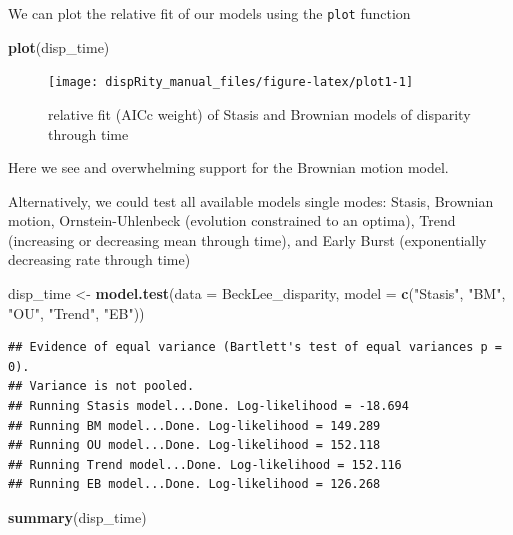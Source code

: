 \documentclass[
]{book}
\newenvironment{Shaded}{\begin{snugshade}}{\end{snugshade}}
\newcommand{\DataTypeTok}[1]{\textcolor[rgb]{0.13,0.29,0.53}{#1}}
\newcommand{\KeywordTok}[1]{\textcolor[rgb]{0.13,0.29,0.53}{\textbf{#1}}}
\newcommand{\NormalTok}[1]{#1}
\newcommand{\StringTok}[1]{\textcolor[rgb]{0.31,0.60,0.02}{#1}}
\begin{document}
We can plot the relative fit of our models using the \texttt{plot} function

\begin{Shaded}
\begin{Highlighting}[]
\KeywordTok{plot}\NormalTok{(disp\_time)}
\end{Highlighting}
\end{Shaded}

\begin{figure}

{\centering \texttt{[image: dispRity\_manual\_files/figure-latex/plot1-1]} 

}

\caption{relative fit (AICc weight) of Stasis and Brownian models of disparity through time}\label{fig:plot1}
\end{figure}

Here we see and overwhelming support for the Brownian motion model.

Alternatively, we could test all available models single modes: Stasis, Brownian motion, Ornstein-Uhlenbeck (evolution constrained to an optima), Trend (increasing or decreasing mean through time), and Early Burst (exponentially decreasing rate through time)

\begin{Shaded}
\begin{Highlighting}[]
\NormalTok{disp\_time \textless{}{-}}\StringTok{ }\KeywordTok{model.test}\NormalTok{(}\DataTypeTok{data =}\NormalTok{ BeckLee\_disparity,}
                  \DataTypeTok{model =} \KeywordTok{c}\NormalTok{(}\StringTok{"Stasis"}\NormalTok{, }\StringTok{"BM"}\NormalTok{, }\StringTok{"OU"}\NormalTok{, }\StringTok{"Trend"}\NormalTok{, }\StringTok{"EB"}\NormalTok{))}
\end{Highlighting}
\end{Shaded}

\begin{verbatim}
## Evidence of equal variance (Bartlett's test of equal variances p = 0).
## Variance is not pooled.
## Running Stasis model...Done. Log-likelihood = -18.694
## Running BM model...Done. Log-likelihood = 149.289
## Running OU model...Done. Log-likelihood = 152.118
## Running Trend model...Done. Log-likelihood = 152.116
## Running EB model...Done. Log-likelihood = 126.268
\end{verbatim}

\begin{Shaded}
\begin{Highlighting}[]
\KeywordTok{summary}\NormalTok{(disp\_time)}
\end{Highlighting}
\end{Shaded}
\end{document}
